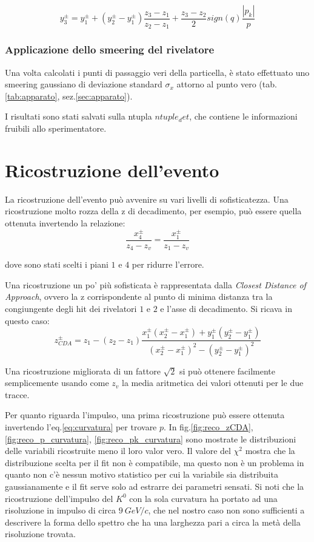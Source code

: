 \documentclass[8pt]{extarticle}
\begin{document}
\begin{equation}
y_3^{\pm} = y_1^{\pm} + (y_2^{\pm}-y_1^{\pm})\frac{z_3-z_1}{z_2-z_1} + \frac{z_3-z_2}{2} sign(q) \frac{|p_k|}{p}
\end{equation}

\subsubsection{Applicazione dello smeering del rivelatore}
Una volta calcolati i punti di passaggio veri della particella, è stato effettuato uno smeering gaussiano di deviazione standard $\sigma_x$ attorno al punto vero (tab.\ref{tab:apparato}, sez.\ref{sec:apparato}).

I risultati sono stati salvati sulla ntupla $ntuple_det$, che contiene le informazioni fruibili allo sperimentatore.

\section{Ricostruzione dell'evento} \label{sec:reconstruction}

La ricostruzione dell'evento può avvenire su vari livelli di sofisticatezza. Una ricostruzione molto rozza della z di decadimento, per esempio, può essere quella ottenuta invertendo la relazione:
$$
\frac{x_4^{\pm}}{z_4-z_v} = \frac{x_1^{\pm}}{z_1-z_v}
$$

dove sono stati scelti i piani $1$ e $4$ per ridurre l'errore.

Una ricostruzione un po' più sofisticata è rappresentata dalla \textit{Closest Distance of Approach}, ovvero la z corrispondente al punto di minima distanza tra la congiungente degli hit dei rivelatori $1$ e $2$ e l'asse di decadimento. Si ricava in questo caso:
$$
z_{CDA}^{\pm} = z_1 - (z_2-z_1)\frac{x_1^{\pm}(x_2^{\pm}-x_1^{\pm}) + y_1^{\pm}(y_2^{\pm} - y_1^{\pm})}{(x_2^{\pm}-x_1^{\pm})^2-(y_2^{\pm}-y_1^{\pm})^2}
$$

Una ricostruzione migliorata di un fattore $\sqrt{2}$ si può ottenere facilmente semplicemente usando come $z_v$ la media aritmetica dei valori ottenuti per le due tracce. \medskip

Per quanto riguarda l'impulso, una prima ricostruzione può essere ottenuta invertendo l'eq.\ref{eq:curvatura} per trovare $p$. In fig.\ref{fig:reco_zCDA},\ref{fig:reco_p_curvatura}, \ref{fig:reco_pk_curvatura} sono mostrate le distribuzioni delle variabili ricostruite meno il loro valor vero. Il valore del $\chi^2$ mostra che la distribuzione scelta per il fit non è compatibile, ma questo non è un problema in quanto non c'è nessun motivo statistico per cui la variabile sia distribuita gaussianamente e il fit serve solo ad estrarre dei parametri sensati. Si noti che la ricostruzione dell'impulso del $K^0$ con la sola curvatura ha portato ad una risoluzione in impulso di circa $9\ GeV/c$, che nel nostro caso non sono sufficienti a descrivere la forma dello spettro che ha una larghezza pari a circa la metà della risoluzione trovata.
\end{document}
